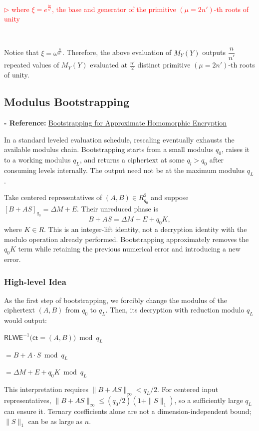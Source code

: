 \textcolor{red}{ $\rhd$ where $\xi = e^{\frac{i\pi}{n'}}$, the base and generator of the primitive $(\mu=2n')$-th roots of unity}

$ $

Notice that $\xi = \omega^{\frac{n}{n'}}$. Therefore, the above evaluation of $M_Y(Y)$ outputs $\dfrac{n}{n'}$ repeated values of $M_Y(Y)$ evaluated at $\frac{n'}{2}$ distinct primitive $(\mu=2n')$-th roots of unity.



\subsection{Modulus Bootstrapping}
\label{subsec:ckks-bootstrapping}

\textbf{- Reference:} \href{https://eprint.iacr.org/2018/153.pdf}{Bootstrapping for Approximate Homomorphic Encryption}~\cite{ckks}

In a standard leveled evaluation schedule, rescaling eventually exhausts the available modulus chain. Bootstrapping starts from a small modulus $q_0$, raises it to a working modulus $q_L$, and returns a ciphertext at some $q_l>q_0$ after consuming levels internally. The output need not be at the maximum modulus $q_L$.

Take centered representatives of $(A,B)\in R_{q_0}^2$ and suppose $[B+AS]_{q_0}=\Delta M+E$. Their unreduced phase is
\[
B+AS=\Delta M+E+q_0K,
\]
where $K\in R$. This is an integer-lift identity, not a decryption identity with the modulo operation already performed. Bootstrapping approximately removes the $q_0K$ term while retaining the previous numerical error and introducing a new error.

\subsubsection{High-level Idea}
\label{subsubsec:ckks-bootstrapping-high-level}

As the first step of bootstrapping, we forcibly change the modulus of the ciphertext $(A, B)$ from $q_0$ to $q_L$. Then, its decryption with reduction modulo $q_L$ would output:

$\textsf{RLWE}^{-1}\textbf{(}\textsf{ct} = (A, B)\textbf{)} \bmod q_L$

$ = B + A\cdot S \bmod q_L$

$= \Delta M + E + q_0 K \bmod q_L$

This interpretation requires $\|B+AS\|_\infty<q_L/2$. For centered input representatives, $\|B+AS\|_\infty\leq(q_0/2)(1+\|S\|_1)$, so a sufficiently large $q_L$ can ensure it. Ternary coefficients alone are not a dimension-independent bound; $\|S\|_1$ can be as large as $n$.


